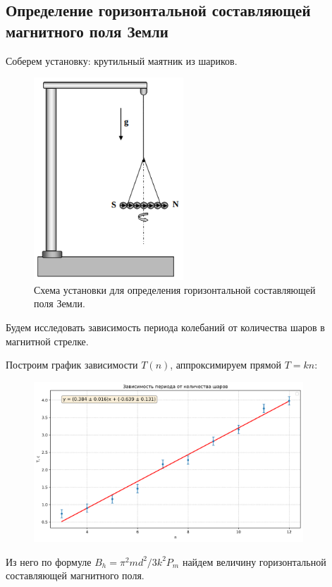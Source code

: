 \documentclass[a4paper, 12pt]{article}
\begin{document}
\subsection{Определение горизонтальной составляющей магнитного поля Земли}
Соберем установку: крутильный маятник из шариков.
\begin{figure}[h]
  \centering
  \includegraphics[width=0.5\textwidth]{Images/krut.png}
  \caption{Схема установки для определения горизонтальной составляющей поля Земли.}
\end{figure}

Будем исследовать зависимость периода колебаний от количества шаров в магнитной
стрелке.

Построим график зависимости $T(n)$, аппроксимируем прямой $T=kn$:

\begin{figure}[h]
  \centering
  \includegraphics[width=0.9\textwidth]{Images/period.png}
\end{figure}

Из него по формуле $B_h=\pi^2md^2/3k^2P_m$ найдем величину горизонтальной составляющей
магнитного поля.
\end{document}
